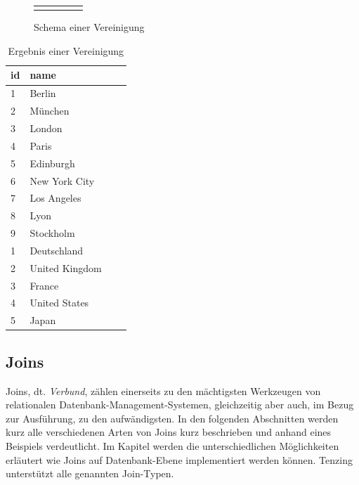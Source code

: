 \documentclass[a4paper]{article}
\begin{document}
\begin{minipage}{\textwidth}
\begin{minipage}[b]{0.49\textwidth}
\begin{figure}[H]
\begin{tabular}{| c | c | c | c | c |}
    \cellcolor{cell-odd} & \cellcolor{cell-odd} & \cellcolor{cell-odd} &  \cellcolor{cell-odd} & \cellcolor{cell-odd} \\ \hline
    \cellcolor{cell-odd} & \cellcolor{cell-odd} & \cellcolor{cell-odd} &  \cellcolor{cell-odd} & \cellcolor{cell-odd} \\ \hline
  \end{tabular}
\caption{Schema einer Vereinigung}
\label{fig:union}
\end{figure}
\end{minipage}
\hfill
\begin{minipage}[b]{0.49\textwidth}
\begin{table}[H]
\centering
  \begin{tabular}{| l | l | l | l |}
    \hline
    id & name\\ \hline
    \hline
   1 & Berlin \\ \hline
   2 & München \\ \hline
   3 & London \\ \hline
   4 & Paris \\ \hline
   5 & Edinburgh \\ \hline
   6 & New York City \\ \hline
   7 & Los Angeles \\ \hline
   8 & Lyon \\ \hline
   9 & Stockholm  \\ \hline
    1 & Deutschland \\ \hline
    2 & United Kingdom \\ \hline
    3 & France \\ \hline
    4 & United States \\ \hline
    5 & Japan \\ \hline
  \end{tabular}
\caption{Ergebnis einer Vereinigung}
\label{tab:union}
\end{table}
\end{minipage}
\end{minipage}

\newpage
\subsection{Joins}
Joins, dt. \textit{Verbund}, zählen einerseits zu den mächtigsten Werkzeugen von relationalen Datenbank-Management-Systemen, gleichzeitig aber auch, im Bezug zur Ausführung, zu den aufwändigsten. In den folgenden Abschnitten werden kurz alle verschiedenen Arten von Joins kurz beschrieben und anhand eines Beispiels verdeutlicht. Im Kapitel  werden die unterschiedlichen Möglichkeiten erläutert wie Joins auf Datenbank-Ebene implementiert werden können. Tenzing unterstützt alle genannten Join-Typen.
\end{document}
